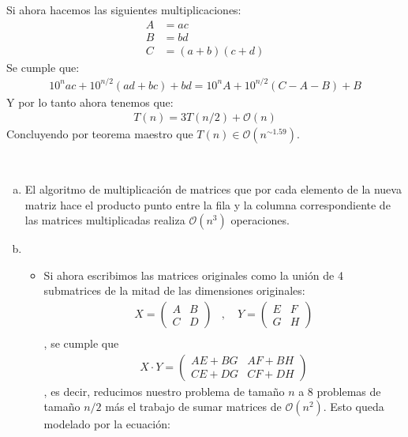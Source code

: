 \documentclass[dcc,uchile]{fcfmcourse}
\begin{document}
\begin{problems}
\begin{enumerate}[a)]
    Si ahora hacemos las siguientes multiplicaciones:
    \begin{align*}
        A &= ac\\
        B &= bd\\
        C &= (a+b)(c+d)
    \end{align*}
    Se cumple que:
    \begin{align*}
        10^nac + 10^{n/2}(ad+bc) + bd = 10^nA + 10^{n/2}(C-A-B) + B
    \end{align*}
    Y por lo tanto ahora tenemos que:
    \begin{align*}
        T(n) = 3T(n/2) + \mathcal{O}(n)
    \end{align*}
    Concluyendo por teorema maestro que $T(n) \in \mathcal{O}(n^{\sim 1.59})$.
\end{enumerate}
\\
 \begin{enumerate}[a)]
     \item El algoritmo de multiplicación de matrices que por cada elemento de la nueva matriz hace el producto punto entre la fila y la columna correspondiente de las matrices multiplicadas realiza $\mathcal{O}(n^3)$ operaciones. \flash
     \item 
     \begin{itemize}
         \item Si ahora escribimos las matrices originales como la unión de 4 submatrices de la mitad de las dimensiones originales:
     \begin{align*}
         X = \begin{pmatrix}
           A & B \\
            C & D
         \end{pmatrix} &,\quad Y = 
         \begin{pmatrix}
           E & F \\
            G & H
         \end{pmatrix}\\
     \end{align*}
     , se cumple que
     \begin{align*}
         X\cdot Y = \begin{pmatrix}
           AE + BG & AF + BH \\
            CE + DG & CF + DH
         \end{pmatrix}
         \end{align*}
        , es decir, reducimos nuestro problema de tamaño $n$ a 8 problemas de tamaño $n/2$ más el trabajo de sumar matrices de $\mathcal{O}(n^2)$. Esto queda modelado por la ecuación:

\end{itemize}
\end{enumerate}
\end{problems}
\end{document}
